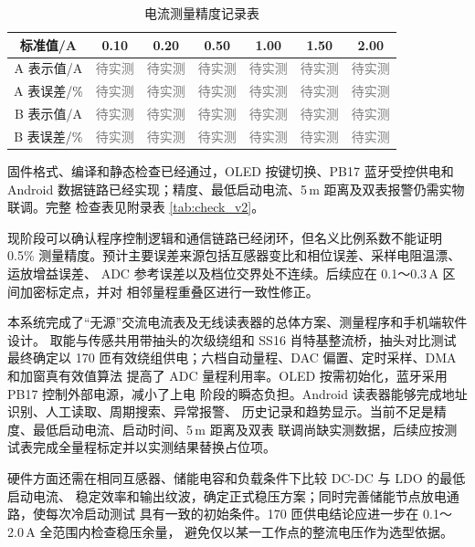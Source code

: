 \documentclass[12pt,a4paper]{article}
\newcommand{\xiaosi}{\fontsize{12bp}{22bp}\selectfont}
\newcommand{\wuhao}{\fontsize{10.5bp}{15bp}\selectfont}
\newcommand{\placeholder}{\textcolor{gray}{待实测}}
\newcommand{\mainheading}[1]{%
  \par\vspace{7.8pt}\noindent{\fontsize{16bp}{22bp}\selectfont\bfseries #1}\par
  \vspace{4pt}}
\newcommand{\thirdheading}[1]{%
  \par\noindent{\xiaosi\bfseries #1}\par}
\begin{document}
\begin{table}[H]
\centering
\caption{电流测量精度记录表}
\label{tab:accuracy_v2}
\wuhao
\begin{tabular}{|c|c|c|c|c|c|c|}
\hline
标准值/A & 0.10 & 0.20 & 0.50 & 1.00 & 1.50 & 2.00\\ \hline
A 表示值/A & \placeholder & \placeholder & \placeholder & \placeholder & \placeholder & \placeholder\\ \hline
A 表误差/\% & \placeholder & \placeholder & \placeholder & \placeholder & \placeholder & \placeholder\\ \hline
B 表示值/A & \placeholder & \placeholder & \placeholder & \placeholder & \placeholder & \placeholder\\ \hline
B 表误差/\% & \placeholder & \placeholder & \placeholder & \placeholder & \placeholder & \placeholder\\ \hline
\end{tabular}
\end{table}

\thirdheading{（3）阶段性功能检查}

固件格式、编译和静态检查已经通过，OLED 按键切换、PB17 蓝牙受控供电和 Android
数据链路已经实现；精度、最低启动电流、5\,m 距离及双表报警仍需实物联调。完整
检查表见附录表 \ref{tab:check_v2}。

现阶段可以确认程序控制逻辑和通信链路已经闭环，但名义比例系数不能证明 0.5\%
测量精度。预计主要误差来源包括互感器变比和相位误差、采样电阻温漂、运放增益误差、
ADC 参考误差以及档位交界处不连续。后续应在 0.1～0.3\,A 区间加密标定点，并对
相邻量程重叠区进行一致性修正。

\mainheading{五、\quad 总结}

本系统完成了``无源''交流电流表及无线读表器的总体方案、测量程序和手机端软件设计。
取能与传感共用带抽头的次级绕组和 SS16 肖特基整流桥，抽头对比测试最终确定以
170 匝有效绕组供电；六档自动量程、DAC 偏置、定时采样、DMA 和加窗真有效值算法
提高了 ADC 量程利用率。OLED 按需初始化，蓝牙采用 PB17 控制外部电源，减小了上电
阶段的瞬态负担。Android 读表器能够完成地址识别、人工读取、周期搜索、异常报警、
历史记录和趋势显示。当前不足是精度、最低启动电流、启动时间、5\,m 距离及双表
联调尚缺实测数据，后续应按测试表完成全量程标定并以实测结果替换占位项。

硬件方面还需在相同互感器、储能电容和负载条件下比较 DC-DC 与 LDO 的最低启动电流、
稳定效率和输出纹波，确定正式稳压方案；同时完善储能节点放电通路，使每次冷启动测试
具有一致的初始条件。170 匝供电结论应进一步在 0.1～2.0\,A 全范围内检查稳压余量，
避免仅以某一工作点的整流电压作为选型依据。
\end{document}
